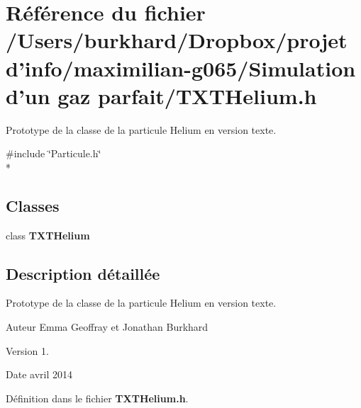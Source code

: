 \section{Référence du fichier /\+Users/burkhard/\+Dropbox/projet d'info/maximilian-\/g065/\+Simulation d'un gaz parfait/\+T\+X\+T\+Helium.h}
\label{_t_x_t_helium_8h}


Prototype de la classe de la particule Helium en version texte.  


{\ttfamily \#include \char`\"{}Particule.\+h\char`\"{}}\\*
\subsection*{Classes}
\begin{DoxyCompactItemize}
\item 
class {\bf T\+X\+T\+Helium}
\end{DoxyCompactItemize}


\subsection{Description détaillée}
Prototype de la classe de la particule Helium en version texte. 

\begin{DoxyAuthor}{Auteur}
Emma Geoffray et Jonathan Burkhard 
\end{DoxyAuthor}
\begin{DoxyVersion}{Version}
1. 
\end{DoxyVersion}
\begin{DoxyDate}{Date}
avril 2014 
\end{DoxyDate}


Définition dans le fichier {\bf T\+X\+T\+Helium.\+h}.


